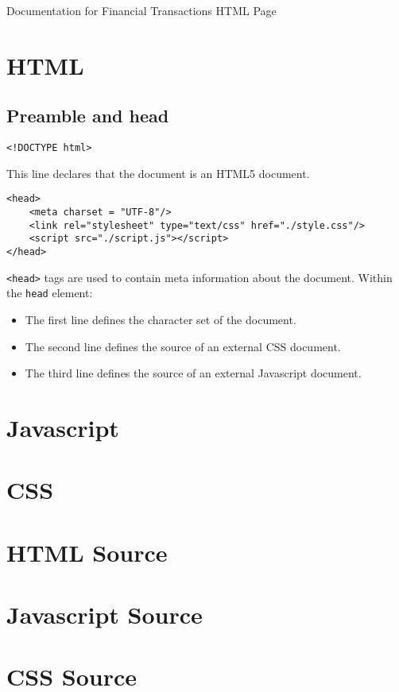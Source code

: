 \documentclass[letterpaper]{article}
\begin{document}
\vspace*{\fill}
\begin{center}
    \Large
    Documentation for Financial Transactions HTML Page
\end{center}
\vspace*{\fill}

\newpage
{}
\tableofcontents

\newpage
{}

\section{HTML}

\subsection{Preamble and head}

\begin{lstlisting}[firstnumber=1]
<!DOCTYPE html>
\end{lstlisting}

This line declares that the document is an HTML5 document.

\begin{lstlisting}[firstnumber=2]
<head>
    <meta charset = "UTF-8"/>
    <link rel="stylesheet" type="text/css" href="./style.css"/>
    <script src="./script.js"></script>
</head>
\end{lstlisting}

\lstinline{<head>} tags are used to contain meta information about the document.
Within the \lstinline{head} element:

\begin{itemize}
    \item The first line defines the character set of the document.
    \item The second line defines the source of an external CSS document.
    \item The third line defines the source of an external Javascript document.
\end{itemize}

\newpage

\section{Javascript}

\newpage

\section{CSS}

\newpage

\appendix
\section{HTML Source}


\newpage

\section{Javascript Source}


\newpage

\section{CSS Source}

\end{document}
